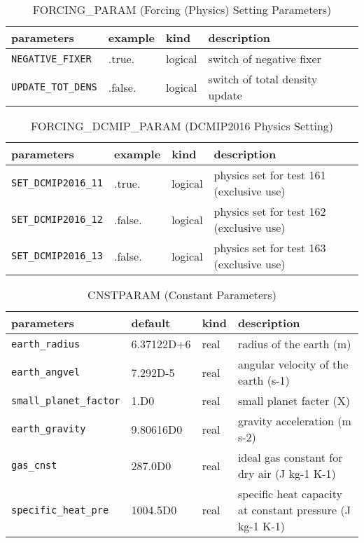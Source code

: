 \begin{table}[htb]
\begin{center}
\caption{FORCING\_PARAM (Forcing (Physics) Setting Parameters)}
\begin{tabularx}{150mm}{|l|l|l|X|} \hline
 \rowcolor[gray]{0.9} parameters & example & kind & description          \\ \hline
 \verb|NEGATIVE_FIXER|  & .true.  & logical & switch of negative fixer \\ \hline
 \verb|UPDATE_TOT_DENS| & .false. & logical & switch of total density update \\ \hline
\end{tabularx}
\end{center}
\end{table}

\begin{table}[htb]
\begin{center}
\caption{FORCING\_DCMIP\_PARAM (DCMIP2016 Physics Setting)}
\begin{tabularx}{150mm}{|l|l|l|X|} \hline
 \rowcolor[gray]{0.9} parameters & example & kind & description          \\ \hline
 \verb|SET_DCMIP2016_11| & .true.  & logical & physics set for test 161 (exclusive use) \\ \hline
 \verb|SET_DCMIP2016_12| & .false. & logical & physics set for test 162 (exclusive use) \\ \hline
 \verb|SET_DCMIP2016_13| & .false. & logical & physics set for test 163 (exclusive use) \\ \hline
\end{tabularx}
\end{center}
\end{table}

\begin{table}[htb]
\begin{center}
\caption{CNSTPARAM (Constant Parameters)}
\begin{tabularx}{150mm}{|l|l|l|X|} \hline
 \rowcolor[gray]{0.9} parameters & default & kind & description          \\ \hline
 \verb|earth_radius| & 6.37122D+6  & real & radius of the earth (m) \\ \hline
 \verb|earth_angvel| & 7.292D-5    & real & angular velocity of the earth (s-1) \\ \hline
 \verb|small_planet_factor| & 1.D0 & real & small planet facter (X) \\ \hline
 \verb|earth_gravity|       & 9.80616D0 & real & gravity acceleration (m s-2) \\ \hline
 \verb|gas_cnst|            & 287.0D0   & real & ideal gas constant for dry air (J kg-1 K-1) \\ \hline
 \verb|specific_heat_pre|   & 1004.5D0  & real & specific heat capacity at constant pressure (J kg-1 K-1) \\ \hline
\end{tabularx}
\end{center}
\end{table}

